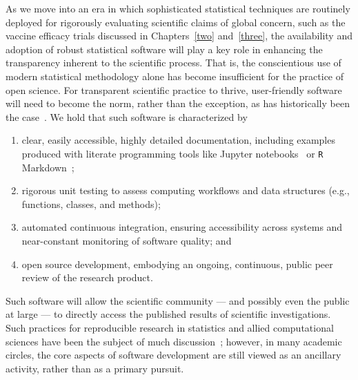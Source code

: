 \citep{perez2013literate}

As we move into an era in which sophisticated statistical techniques are
routinely deployed for rigorously evaluating scientific claims of global
concern, such as the vaccine efficacy trials discussed in Chapters~\ref{two}
and~\ref{three}, the availability and adoption of robust statistical software
will play a key role in enhancing the transparency inherent to the scientific
process. That is, the conscientious use of modern statistical methodology alone
has become insufficient for the practice of open science. For transparent
scientific practice to thrive, user-friendly software will need to become the
norm, rather than the exception, as has historically been the
case~\citep{stromberg2004write, pullenayegum2016knowledge}. We hold that such
software is characterized by
\begin{enumerate}[itemsep=-1ex]
  \item clear, easily accessible, highly detailed documentation, including
      examples produced with literate programming tools like Jupyter
      notebooks~\citep{kluyver2016jupyter, granger2021jupyter} or \texttt{R}
      Markdown~\citep{xie2018r};
   \item rigorous unit testing to assess computing workflows and data structures
      (e.g., functions, classes, and methods);
  \item automated continuous integration, ensuring accessibility across systems
       and near-constant monitoring of software quality; and
  \item open source development, embodying an ongoing, continuous, public
      peer review of the research product.
\end{enumerate}
Such software will allow the scientific community --- and possibly even the
public at large --- to directly access the published results of scientific
investigations. Such practices for reproducible research in statistics and
allied computational sciences have been the subject of much
discussion~\citep[e.g.,][]{peng2009reproducible, peng2011reproducible,
stodden2014implementing, kitzes2017practice, millman2018developing}; however, in
many academic circles, the core aspects of software development are still viewed
as an ancillary activity, rather than as a primary pursuit.

